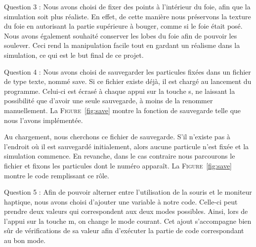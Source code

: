 \documentclass[a4paper,12pt]{article}
\begin{document}
Question 3 : Nous avons choisi de fixer des points à l'intérieur du foie, afin que la simulation soit plus réaliste. En effet, de cette manière nous préservons la \og{}texture\fg{} du foie en autorisant la partie supérieure à bouger, comme si le foie était posé. Nous avons également souhaité conserver les lobes du foie afin de pouvoir les soulever. Ceci rend la manipulation facile tout en gardant un réalisme dans la simulation, ce qui est le but final de ce projet.

Question 4 : Nous avons choisi de sauvegarder les particules fixées dans un fichier de type texte, nommé \og{}save\fg{}. Si ce fichier existe déjà, il est chargé au lancement du programme. Celui-ci est écrasé à chaque appui sur la touche \og{}s\fg{}, ne laissant la possibilité que d'avoir une seule sauvegarde, à moins de la renommer manuellement. La \textsc{Figure}~\ref{fig:save} montre la fonction de sauvegarde telle que nous l'avons implémentée. 

Au chargement, nous cherchons ce fichier de sauvegarde. S'il n'existe pas à l'endroit où il est sauvegardé initialement, alors aucune particule n'est fixée et la simulation commence. En revanche, dans le cas contraire nous parcourons le fichier et fixons les particules dont le numéro apparaît. La \textsc{Figure}~\ref{fig:save} montre le code remplissant ce rôle.

Question 5 : Afin de pouvoir alterner entre l'utilisation de la souris et le moniteur haptique, nous avons choisi d'ajouter une variable à notre code. Celle-ci peut prendre deux valeurs qui correspondent aux deux modes possibles. Ainsi, lors de l'appui sur la touche \og{}m\fg{}, on change le mode courant. Cet ajout s'accompagne bien sûr de vérifications de sa valeur afin d'exécuter la partie de code correspondant au bon mode.
\end{document}
